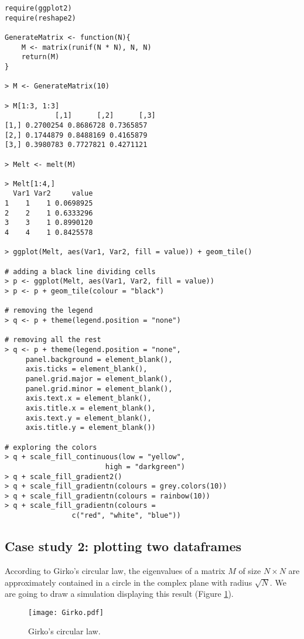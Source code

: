 \begin{lstlisting}
require(ggplot2)
require(reshape2)

GenerateMatrix <- function(N){
	M <- matrix(runif(N * N), N, N)
	return(M)
}

> M <- GenerateMatrix(10)

> M[1:3, 1:3]
			[,1]      [,2]      [,3]
[1,] 0.2700254 0.8686728 0.7365857
[2,] 0.1744879 0.8488169 0.4165879
[3,] 0.3980783 0.7727821 0.4271121

> Melt <- melt(M)

> Melt[1:4,]
  Var1 Var2     value
1    1    1 0.0698925
2    2    1 0.6333296
3    3    1 0.8990120
4    4    1 0.8425578

> ggplot(Melt, aes(Var1, Var2, fill = value)) + geom_tile()

# adding a black line dividing cells
> p <- ggplot(Melt, aes(Var1, Var2, fill = value))
> p <- p + geom_tile(colour = "black")

# removing the legend
> q <- p + theme(legend.position = "none")

# removing all the rest
> q <- p + theme(legend.position = "none", 
	 panel.background = element_blank(),
	 axis.ticks = element_blank(), 
	 panel.grid.major = element_blank(),
	 panel.grid.minor = element_blank(),
	 axis.text.x = element_blank(),
	 axis.title.x = element_blank(),
	 axis.text.y = element_blank(),
	 axis.title.y = element_blank())

# exploring the colors
> q + scale_fill_continuous(low = "yellow",
						high = "darkgreen")
> q + scale_fill_gradient2()
> q + scale_fill_gradientn(colours = grey.colors(10))
> q + scale_fill_gradientn(colours = rainbow(10))
> q + scale_fill_gradientn(colours =
				c("red", "white", "blue"))
\end{lstlisting}


\subsection{Case study 2: plotting two dataframes}

According to Girko's circular law, the eigenvalues of a matrix $M$ of
size $N \times N$ are approximately contained in a circle in the
complex plane with radius $\sqrt{N}$. We are going to draw a
simulation displaying this result (Figure \ref{Girko}).


\begin{figure}\centering
	\texttt{[image: Girko.pdf]}
	\caption{Girko's circular law.}
	\label{Girko}
\end{figure}

